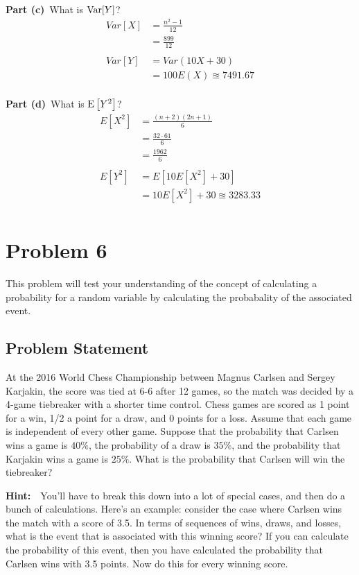 \documentclass[12pt]{article}
\theoremstyle{definition}
\begin{document}
\newpage
\noindent
{\bf Part (c)}\ What is $\hbox{Var}[Y]$?
\begin{align*}
Var[X] &= \frac{n^2 - 1}{12}\\
&= \frac{899}{12}\\\\
Var[Y] &= Var(10X + 30)\\
&=100E(X) \approxeq 7491.67\\
\end{align*}


\noindent
{\bf Part (d)}\ What is $\hbox{E}\left[ Y^2 \right ]$?
\begin{align*}
E[X^2] &= \frac{(n+2)(2n+1)}{6}\\
&= \frac{32\cdot61}{6}\\
&= \frac{1962}{6}\\\\
E[Y^2] &= E[10E[X^2] + 30]\\
&= 10E[X^2] + 30 \approxeq 3283.33\\
\end{align*}


\newpage
\section*{Problem 6}

This problem will test your understanding of the concept of calculating a probability for a random variable by calculating the probabality of the associated event.

\subsection*{Problem Statement}

At the 2016 World Chess Championship between Magnus Carlsen and Sergey Karjakin, the score was tied at 6-6 after 12 games, so the match was decided by a 4-game tiebreaker with a shorter time control. Chess games are scored as 1 point for a win, 1/2 a point for a draw, and 0 points for a loss. Assume that each game is independent of every other game. Suppose that the probability that Carlsen wins a game is $40\%$, the probability of a draw is $35\%$, and the probability that Karjakin wins a game is $25\%$. What is the probability that Carlsen will win the tiebreaker?

\bigskip
\noindent
{\bf Hint:}\ \ You'll have to break this down into a lot of special cases, and then do a bunch of calculations. Here's an example: consider the case where Carlsen wins the match with a score of 3.5. In terms of sequences of wins, draws, and losses, what is the event that is associated with this winning score? If you can calculate the probability of this event, then you have calculated the probability that Carlsen wins with 3.5 points. Now do this for every winning score.
\end{document}
